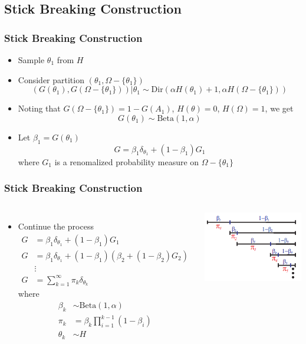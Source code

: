 \documentclass{beamer}
\begin{document}
\subsection{Stick Breaking Construction}
\begin{frame}
	\frametitle{Stick Breaking Construction}
	\begin{itemize}
		\item Sample $\theta_1$ from $H$
		\item { Consider partition $(\theta_1, \Omega - \{\theta_1\}) $}
		\[
			(G(\theta_1), G(\Omega - \{\theta_1\}))|\theta_1 \sim \text{Dir}(\alpha H(\theta_1)+1, \alpha H(\Omega - \{\theta_1\}))
		\]
		\item Noting that $G(\Omega - \{\theta_1\}) = 1-G(A_1)$, $H(\theta)=0$, $H(\Omega)=1$, we get
		\[
			G(\theta_1) \sim \text{Beta}(1, \alpha)
		\]
		\item Let $\beta_1 = G(\theta_1)$
		\[
			G = \beta_1 \delta_{\theta_1} + (1-\beta_1)G_1
		\]
		where $G_1$ is a renomalized probability measure on $\Omega - \{\theta_1\}$
	\end{itemize}
\end{frame}
\begin{frame}
	\frametitle{Stick Breaking Construction}
\begin{columns}
	\begin{itemize}
		\item {Continue the process}
		\begin{align*}
			G & =\beta_1 \delta_{\theta_1} + (1-\beta_1)G_1 \\
			G & =\beta_1 \delta_{\theta_1} + (1-\beta_1)(\beta_2 + (1-\beta_2)G_2) \\
			& \vdots \\
			G &= \sum_{k=1}^{\infty} \pi_k \delta_{\theta_k}
		\end{align*}
		where 
		\begin{align*}
		\beta_k & \sim \text{Beta}(1, \alpha) \\
		\pi_k & = \beta_k \prod_{i=1}^{k-1} (1-\beta_i) \\
		\theta_k & \sim H
		\end{align*}		
	\end{itemize}
	\includegraphics[width=\textwidth]{img/stick.png}
\end{columns}
\end{frame}
\end{document}
